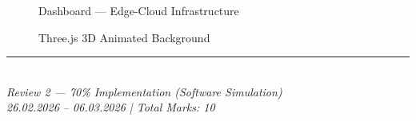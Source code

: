 \documentclass[12pt,a4paper]{article}
\begin{document}
\begin{figure}[H]
    \centering
    \caption{Dashboard — Edge-Cloud Infrastructure}
\end{figure}

\begin{figure}[H]
    \centering
    \caption{Three.js 3D Animated Background}
\end{figure}

\vspace{1cm}
\begin{center}
\rule{0.5\textwidth}{0.4pt}\\[0.3cm]
\textit{Review 2 — 70\% Implementation (Software Simulation)}\\
\textit{26.02.2026 -- 06.03.2026 \quad | \quad Total Marks: 10}
\end{center}
\end{document}

